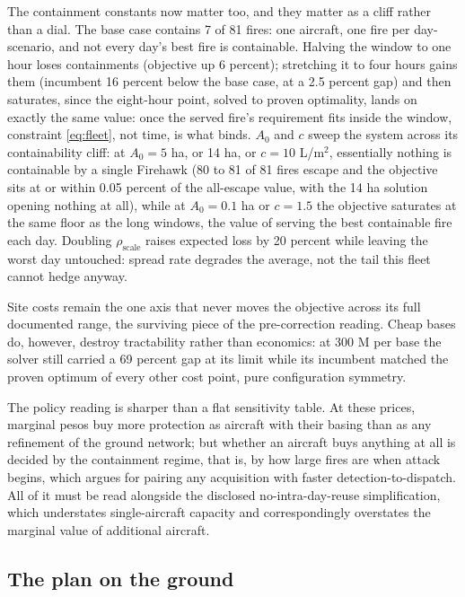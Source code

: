 \documentclass[11pt]{article}
\begin{document}
The containment constants now matter too, and they matter as a cliff
rather than a dial. The base case contains 7 of 81 fires: one
aircraft, one fire per day-scenario, and not every day's best fire is
containable. Halving the window to one hour loses containments
(objective up 6 percent); stretching it to four hours gains them
(incumbent 16 percent below the base case, at a 2.5 percent gap) and
then saturates, since the eight-hour point, solved to proven
optimality, lands on exactly the same value: once the served fire's
requirement fits inside the window, constraint \eqref{eq:fleet}, not
time, is what binds. $A_0$ and $c$ sweep the system across its
containability cliff: at $A_0 = 5$ ha, or 14 ha, or $c = 10$
L/m$^2$, essentially nothing is containable by a single Firehawk (80
to 81 of 81 fires escape and the objective sits at or within 0.05
percent of the all-escape value, with the 14 ha solution opening
nothing at all), while at $A_0 = 0.1$ ha or $c = 1.5$ the objective
saturates at the same floor as the long windows, the value of serving
the best containable fire each day. Doubling
$\rho_{\mathrm{scale}}$ raises expected loss by 20 percent while
leaving the worst day untouched: spread rate degrades the average,
not the tail this fleet cannot hedge anyway.

Site costs remain the one axis that never moves the objective across
its full documented range, the surviving piece of the pre-correction
reading. Cheap bases do, however, destroy tractability rather than
economics: at 300 M per base the solver still carried a 69 percent
gap at its limit while its incumbent matched the proven optimum of
every other cost point, pure configuration symmetry.

The policy reading is sharper than a flat sensitivity table. At these
prices, marginal pesos buy more protection as aircraft with their
basing than as any refinement of the ground network; but whether an
aircraft buys anything at all is decided by the containment regime,
that is, by how large fires are when attack begins, which argues for
pairing any acquisition with faster detection-to-dispatch. All of it
must be read alongside the disclosed no-intra-day-reuse
simplification, which understates single-aircraft capacity and
correspondingly overstates the marginal value of additional
aircraft.

\subsection{The plan on the ground}
\label{sec:ground}
\end{document}
